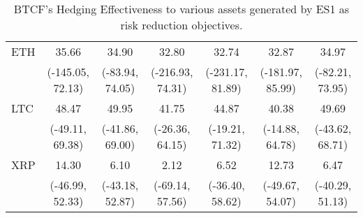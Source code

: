 \begin{table}[t]
{\begin{tabular}{lcccccc}
ETH     &             35.66 &            34.90 &             32.80 &             32.74 &             32.87 &            34.97 \\
        &  (-145.05, 72.13) &  (-83.94, 74.05) &  (-216.93, 74.31) &  (-231.17, 81.89) &  (-181.97, 85.99) &  (-82.21, 73.95) \\
LTC     &             48.47 &            49.95 &             41.75 &             44.87 &             40.38 &            49.69 \\
        &   (-49.11, 69.38) &  (-41.86, 69.00) &   (-26.36, 64.15) &   (-19.21, 71.32) &   (-14.88, 64.78) &  (-43.62, 68.71) \\
XRP     &             14.30 &             6.10 &              2.12 &              6.52 &             12.73 &             6.47 \\
        &   (-46.99, 52.33) &  (-43.18, 52.87) &   (-69.14, 57.56) &   (-36.40, 58.62) &   (-49.67, 54.07) &  (-40.29, 51.13) \\
\bottomrule
\end{tabular}}
\caption{BTCF's Hedging Effectiveness to various assets generated by ES1 as risk reduction objectives.}
\label{tab:ES1HE}
\end{table}